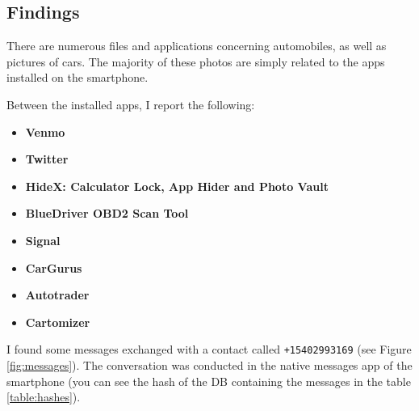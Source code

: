 \documentclass[12pt]{article}
\begin{document}
\subsection{Findings}

There are numerous files and applications concerning automobiles, as well as pictures of cars. The majority of these photos are simply related to the apps installed on the smartphone.

Between the installed apps, I report the following:
\begin{itemize}
    \item \textbf{Venmo} \cite{venmo}
    \item \textbf{Twitter}
    \item \textbf{HideX: Calculator Lock, App Hider and Photo Vault} \cite{calculator} 
    \item \textbf{BlueDriver OBD2 Scan Tool} \cite{blue-driver}
    \item \textbf{Signal} \cite{signal} 
    \item \textbf{CarGurus}
    \item \textbf{Autotrader}
    \item \textbf{Cartomizer}
\end{itemize}

I found some messages exchanged with a contact called \texttt{+15402993169} (see Figure \ref{fig:messages}). The conversation was conducted in the native messages app of the smartphone (you can see the hash of the DB containing the messages in the table \ref{table:hashes}).
\end{document}
